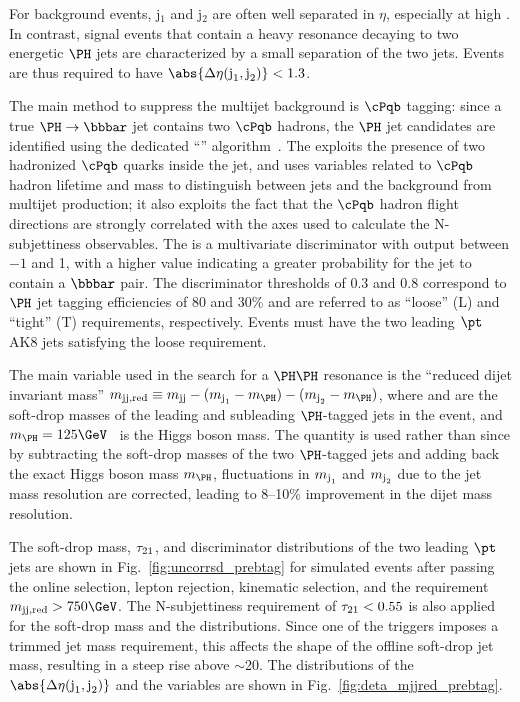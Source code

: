 For background events, j$_{1}$ and j$_{2}$
are often well separated in $\eta$, especially at high \mjj.
In contrast, signal events that contain a heavy resonance decaying to two energetic $\PH$ jets are characterized by a small separation of the two jets. Events are thus required to have $\abs{\DeltaEta} < 1.3$.

The main method to suppress the multijet background is
$\PQb$ tagging: since a true $\PH \to \bbbar$ jet contains two $\PQb$ hadrons,
the $\PH$ jet candidates are identified using the dedicated ``\Hbbt''
algorithm~\cite{CMS-PAS-BTV-15-002}. The \Hbbt exploits the presence
of two hadronized $\PQb$ quarks inside the \PH jet, and uses
variables related to $\PQb$ hadron lifetime and mass to distinguish between
\PH jets and the background from multijet production; it also exploits
the fact that the $\PQb$ hadron flight directions are strongly correlated
with the axes used to calculate the N-subjettiness observables.
The \Hbbt is a multivariate discriminator with output between $-1$ and 1,
with a higher value indicating a greater probability for the jet to contain a $\bbbar$ pair.
The \Hbbt discriminator thresholds of 0.3 and 0.8 correspond to $\PH$ jet
tagging efficiencies of 80 and 30\% and are referred to as ``loose''
(L) and ``tight'' (T) requirements, respectively.
Events must have the two leading $\pt$ AK8 jets satisfying the loose \Hbbt requirement.

The main variable used in the search for a $\PH\PH$ resonance is the ``reduced dijet invariant mass'' $\mjjs \equiv \mjj - (\mjone - \mH) - (\mjtwo - \mH)$, where \mjone and \mjtwo are the soft-drop masses of the leading and subleading $\PH$-tagged jets in the event, and $\mH = 125\GeV$~\cite{Aad:2015zhl,Sirunyan:2017exp} is the Higgs boson mass. The quantity \mjjs is used rather than \mjj since by subtracting the soft-drop masses of the two $\PH$-tagged jets and adding back the exact Higgs boson mass $\mH$, fluctuations in $m_{\text{j}_{1}}$ and $m_{\text{j}_{2}}$ due to the jet mass resolution are corrected, leading to 8--10\% improvement in the dijet mass resolution.

The soft-drop mass, $\tau_{21}$, and \Hbbt discriminator
distributions of the two leading $\pt$ jets are shown in
Fig.~\ref{fig:uncorrsd_prebtag} for simulated events after passing the
online selection, lepton rejection, kinematic selection, and the
requirement $\mjjs > 750\GeV$.
The N-subjettiness requirement of $\tau_{21}
< 0.55$ is also applied for the soft-drop mass and the \Hbbt
distributions.
Since one of the triggers imposes a trimmed jet mass requirement, this affects the shape of the offline soft-drop jet mass, resulting in a steep rise above $\sim$20\GeV.
The distributions of the $\abs{\DeltaEta}$ and the
\mjjred variables are shown in Fig.~\ref{fig:deta_mjjred_prebtag}.

